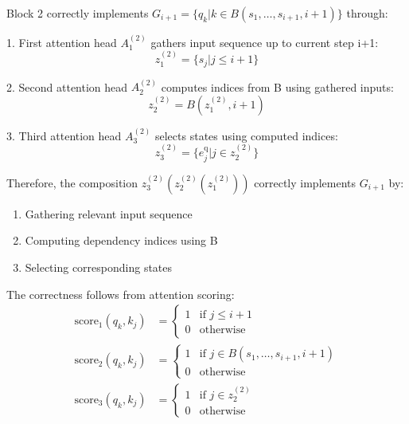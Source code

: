 \begin{lemma}
Block 2 correctly implements $G_{i+1} = \{q_k | k \in B(s_1,\ldots,s_{i+1}, i+1)\}$ through:

1. First attention head $A^{(2)}_1$ gathers input sequence up to current step i+1:
\begin{equation*}
    z^{(2)}_1 = \{s_j | j \leq i+1\}
\end{equation*}

2. Second attention head $A^{(2)}_2$ computes indices from B using gathered inputs:
\begin{equation*}
    z^{(2)}_2 = B(z^{(2)}_1, i+1)
\end{equation*}

3. Third attention head $A^{(2)}_3$ selects states using computed indices:
\begin{equation*}
    z^{(2)}_3 = \{e^{\text{q}}_j | j \in z^{(2)}_2\}
\end{equation*}

Therefore, the composition $z^{(2)}_3(z^{(2)}_2(z^{(2)}_1))$ correctly implements $G_{i+1}$ by:
\begin{enumerate}
    \item Gathering relevant input sequence 
    \item Computing dependency indices using B
    \item Selecting corresponding states
\end{enumerate}

The correctness follows from attention scoring:
\begin{align*}
    \text{score}_1(q_k, k_j) &= \begin{cases}
        1 & \text{if } j \leq i+1 \\
        0 & \text{otherwise}
    \end{cases} \\
    \text{score}_2(q_k, k_j) &= \begin{cases}
        1 & \text{if } j \in B(s_1,\ldots,s_{i+1}, i+1) \\
        0 & \text{otherwise}
    \end{cases} \\
    \text{score}_3(q_k, k_j) &= \begin{cases}
        1 & \text{if } j \in z^{(2)}_2 \\
        0 & \text{otherwise}
    \end{cases}
\end{align*}
\end{lemma}

